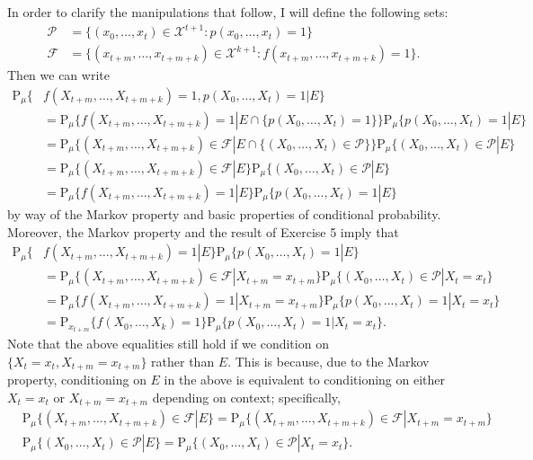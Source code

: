\documentclass[12pt]{article}
\newcommand{\Prob}{\mathrm{P}}
\begin{document}
In order to clarify the manipulations that follow, I will define the following sets:
\begin{align*}
\mathcal{P} &= \{(x_0, \ldots, x_t) \in \mathcal{X}^{t+1} : p(x_0, \ldots, x_t) = 1\} \\
\mathcal{F} &= \{(x_{t+m}, \ldots, x_{t+m+k}) \in \mathcal{X}^{k+1} : f(x_{t+m}, \ldots, x_{t+m+k}) = 1\}.
\end{align*}
Then we can write
\begin{align*}
\Prob_\mu \{&f(X_{t+m}, \ldots, X_{t+m+k}) = 1, p(X_0, \ldots, X_t) = 1 | E\} \\
&= \Prob_\mu \{f(X_{t+m}, \ldots, X_{t+m+k}) = 1 | E \cap \{p(X_0, \ldots, X_t) = 1\}\} \Prob_\mu \{p(X_0, \ldots, X_t) = 1 | E\} \\
&= \Prob_\mu \{(X_{t+m}, \ldots, X_{t+m+k}) \in \mathcal{F} | E \cap \{(X_0, \ldots, X_t) \in \mathcal{P}\}\} \Prob_\mu \{(X_0, \ldots, X_t) \in \mathcal{P} | E\} \\
&= \Prob_\mu \{(X_{t+m}, \ldots, X_{t+m+k}) \in \mathcal{F} | E\} \Prob_\mu \{(X_0, \ldots, X_t) \in \mathcal{P} | E\} \\
&= \Prob_\mu \{f(X_{t+m}, \ldots, X_{t+m+k}) = 1 | E\} \Prob_\mu \{p(X_0, \ldots, X_t) = 1 | E\}
\end{align*}
by way of the Markov property and basic properties of conditional probability. Moreover, the Markov property and the result of Exercise 5 imply that
\begin{align*}
\Prob_\mu \{&f(X_{t+m}, \ldots, X_{t+m+k}) = 1 | E\} \Prob_\mu \{p(X_0, \ldots, X_t) = 1 | E\} \\
&= \Prob_\mu \{(X_{t+m}, \ldots, X_{t+m+k}) \in \mathcal{F} | X_{t+m} = x_{t+m}\} \Prob_\mu \{(X_0, \ldots, X_t) \in \mathcal{P} | X_t = x_t\} \\
&= \Prob_\mu \{f(X_{t+m}, \ldots, X_{t+m+k}) = 1 | X_{t+m} = x_{t+m}\} \Prob_\mu \{p(X_0, \ldots, X_t) = 1 | X_t = x_t\} \\
&= \Prob_{x_{t+m}} \{f(X_0, \ldots, X_k) = 1\} \Prob_\mu \{p(X_0, \ldots, X_t) = 1 | X_t = x_t\}.
\end{align*}
Note that the above equalities still hold if we condition on $\{X_t = x_t, X_{t+m} = x_{t+m}\}$ rather than $E$. This is because, due to the Markov property, conditioning on $E$ in the above is equivalent to conditioning on either $X_t = x_t$ or $X_{t+m} = x_{t+m}$ depending on context; specifically,
\begin{align*}
&\Prob_\mu \{(X_{t+m}, \ldots, X_{t+m+k}) \in \mathcal{F} | E\} = \Prob_\mu \{(X_{t+m}, \ldots, X_{t+m+k}) \in \mathcal{F} | X_{t+m} = x_{t+m}\}\\
&\Prob_\mu \{(X_0, \ldots, X_t) \in \mathcal{P} | E\} = \Prob_\mu \{(X_0, \ldots, X_t) \in \mathcal{P} | X_t = x_t\}.
\end{align*}
\end{document}
